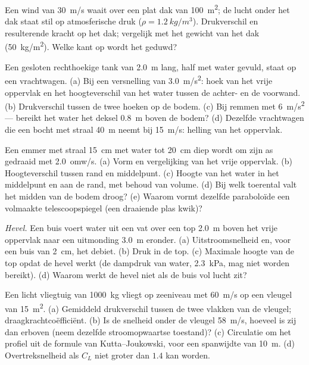 \begin{exercise}[$\star$]\label{exo:b2:euler-bernoulli:4}
Een wind van \qty{30}{m/s} waait over een plat dak van \qty{100}{m^2}; de
lucht onder het dak staat stil op atmosferische druk
($\rho = \qty{1.2}{kg/m^3}$). Drukverschil en resulterende kracht op het
dak; vergelijk met het gewicht van het dak (\qty{50}{kg/m^2}). Welke kant op
wordt het geduwd?
\end{exercise}

\begin{exercise}[$\star\star$]\label{exo:b2:euler-bernoulli:5}
Een gesloten rechthoekige tank van \qty{2.0}{m} lang, half met water gevuld,
staat op een vrachtwagen. (a) Bij een versnelling van \qty{3.0}{m/s^2}: hoek
van het vrije oppervlak en het hoogteverschil van het water tussen de
achter- en de voorwand. (b) Drukverschil tussen de twee hoeken op de bodem.
(c) Bij remmen met \qty{6}{m/s^2} --- bereikt het water het deksel
\qty{0.8}{m} boven de bodem? (d) Dezelfde vrachtwagen die een bocht met
straal \qty{40}{m} neemt bij \qty{15}{m/s}: helling van het oppervlak.
\end{exercise}

\begin{exercise}[$\star\star$]\label{exo:b2:euler-bernoulli:6}
Een emmer met straal \qty{15}{cm} met water tot \qty{20}{cm} diep wordt om
zijn as gedraaid met \qty{2.0}{omw/s}. (a) Vorm en vergelijking van het
vrije oppervlak. (b) Hoogteverschil tussen rand en middelpunt. (c) Hoogte
van het water in het middelpunt en aan de rand, met behoud van volume. (d)
Bij welk toerental valt het midden van de bodem droog? (e) Waarom vormt
dezelfde paraboloïde een volmaakte telescoopspiegel (een draaiende plas
kwik)?
\end{exercise}

\begin{exercise}[$\star\star$]\label{exo:b2:euler-bernoulli:7}
\emph{Hevel.} Een buis voert water uit een vat over een top \qty{2.0}{m}
boven het vrije oppervlak naar een uitmonding \qty{3.0}{m} eronder. (a)
Uitstroomsnelheid en, voor een buis van \qty{2}{cm}, het debiet. (b) Druk in
de top. (c) Maximale hoogte van de top opdat de hevel werkt (de dampdruk van
water, \qty{2.3}{kPa}, mag niet worden bereikt). (d) Waarom werkt de hevel
niet als de buis vol lucht zit?
\end{exercise}

\begin{exercise}[$\star\star$]\label{exo:b2:euler-bernoulli:8}
Een licht vliegtuig van \qty{1000}{kg} vliegt op zeeniveau met \qty{60}{m/s}
op een vleugel van \qty{15}{m^2}. (a) Gemiddeld drukverschil tussen de twee
vlakken van de vleugel; draagkrachtcoëfficiënt. (b) Is de snelheid onder de
vleugel \qty{58}{m/s}, hoeveel is zij dan erboven (neem dezelfde
stroomopwaartse toestand)? (c) Circulatie om het profiel uit de formule van
Kutta--Joukowski, voor een spanwijdte van \qty{10}{m}. (d) Overtreksnelheid
als $C_L$ niet groter dan $1.4$ kan worden.
\end{exercise}

